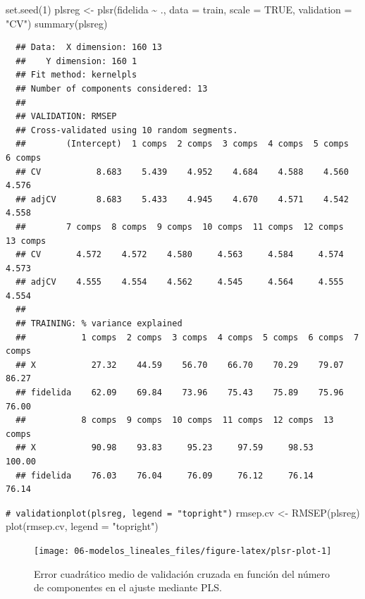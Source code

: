 \documentclass[
]{book}
\newenvironment{Shaded}{\begin{snugshade}}{\end{snugshade}}
\newcommand{\AttributeTok}[1]{\textcolor[rgb]{0.77,0.63,0.00}{#1}}
\newcommand{\CommentTok}[1]{\textcolor[rgb]{0.56,0.35,0.01}{\textit{#1}}}
\newcommand{\ConstantTok}[1]{\textcolor[rgb]{0.00,0.00,0.00}{#1}}
\newcommand{\DecValTok}[1]{\textcolor[rgb]{0.00,0.00,0.81}{#1}}
\newcommand{\FunctionTok}[1]{\textcolor[rgb]{0.00,0.00,0.00}{#1}}
\newcommand{\NormalTok}[1]{#1}
\newcommand{\OtherTok}[1]{\textcolor[rgb]{0.56,0.35,0.01}{#1}}
\newcommand{\SpecialCharTok}[1]{\textcolor[rgb]{0.00,0.00,0.00}{#1}}
\newcommand{\StringTok}[1]{\textcolor[rgb]{0.31,0.60,0.02}{#1}}
\theoremstyle{break}
\theoremstyle{nonumberplain}
\renewcommand{\CommentTok}[1]{\textcolor[rgb]{0.41,0.41,0.41}{\texttt{#1}}}
\begin{document}
\begin{Shaded}
\begin{Highlighting}[]
\FunctionTok{set.seed}\NormalTok{(}\DecValTok{1}\NormalTok{)}
\NormalTok{plsreg }\OtherTok{\textless{}{-}} \FunctionTok{plsr}\NormalTok{(fidelida }\SpecialCharTok{\textasciitilde{}}\NormalTok{ ., }\AttributeTok{data =}\NormalTok{ train, }\AttributeTok{scale =} \ConstantTok{TRUE}\NormalTok{, }\AttributeTok{validation =} \StringTok{"CV"}\NormalTok{)}
\FunctionTok{summary}\NormalTok{(plsreg)}
\end{Highlighting}
\end{Shaded}

\begin{verbatim}
  ## Data:  X dimension: 160 13 
  ##    Y dimension: 160 1
  ## Fit method: kernelpls
  ## Number of components considered: 13
  ## 
  ## VALIDATION: RMSEP
  ## Cross-validated using 10 random segments.
  ##        (Intercept)  1 comps  2 comps  3 comps  4 comps  5 comps  6 comps
  ## CV           8.683    5.439    4.952    4.684    4.588    4.560    4.576
  ## adjCV        8.683    5.433    4.945    4.670    4.571    4.542    4.558
  ##        7 comps  8 comps  9 comps  10 comps  11 comps  12 comps  13 comps
  ## CV       4.572    4.572    4.580     4.563     4.584     4.574     4.573
  ## adjCV    4.555    4.554    4.562     4.545     4.564     4.555     4.554
  ## 
  ## TRAINING: % variance explained
  ##           1 comps  2 comps  3 comps  4 comps  5 comps  6 comps  7 comps
  ## X           27.32    44.59    56.70    66.70    70.29    79.07    86.27
  ## fidelida    62.09    69.84    73.96    75.43    75.89    75.96    76.00
  ##           8 comps  9 comps  10 comps  11 comps  12 comps  13 comps
  ## X           90.98    93.83     95.23     97.59     98.53    100.00
  ## fidelida    76.03    76.04     76.09     76.12     76.14     76.14
\end{verbatim}

\begin{Shaded}
\begin{Highlighting}[]
\CommentTok{\# validationplot(plsreg, legend = "topright")}
\NormalTok{rmsep.cv }\OtherTok{\textless{}{-}} \FunctionTok{RMSEP}\NormalTok{(plsreg)}
\FunctionTok{plot}\NormalTok{(rmsep.cv, }\AttributeTok{legend =} \StringTok{"topright"}\NormalTok{)}
\end{Highlighting}
\end{Shaded}

\begin{figure}[!htb]

{\centering \texttt{[image: 06-modelos\_lineales\_files/figure-latex/plsr-plot-1]} 

}

\caption{Error cuadrático medio de validación cruzada en función del número de componentes en el ajuste mediante PLS.}\label{fig:plsr-plot}
\end{figure}
\end{document}
